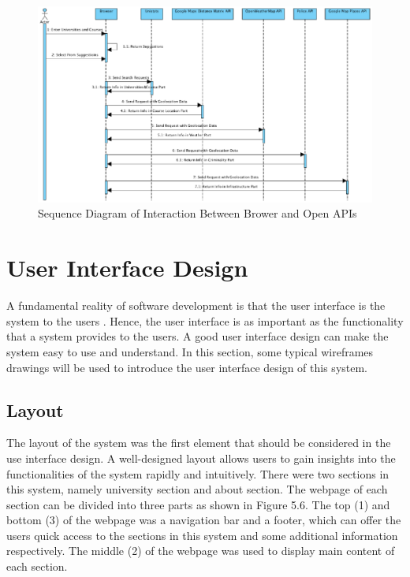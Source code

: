 \begin{figure}[H]
  \centering
  \includegraphics[width=15cm]{./img/Picture11}
  \caption{Sequence Diagram of Interaction Between Brower and Open APIs}
  \label{Figure:figex}
\end{figure}


\section{User Interface Design
}

A fundamental reality of software development is that the user interface is the system to the users \cite{ambler2000user}. Hence, the user interface is as important as the functionality that a system provides to the users. A good user interface design can make the system easy to use and understand. In this section, some typical wireframes drawings will be used to introduce the user interface design of this system.


\subsection{Layout}

The layout of the system was the first element that should be considered in the use interface design. A well-designed layout allows users to gain insights into the functionalities of the system rapidly and intuitively. There were two sections in this system, namely university section and about section. The webpage of each section can be divided into three parts as shown in Figure 5.6. The top (1) and bottom (3) of the webpage was a navigation bar and a footer, which can offer the users quick access to the sections in this system and some additional information respectively. The middle (2) of the webpage was used to display main content of each section.



